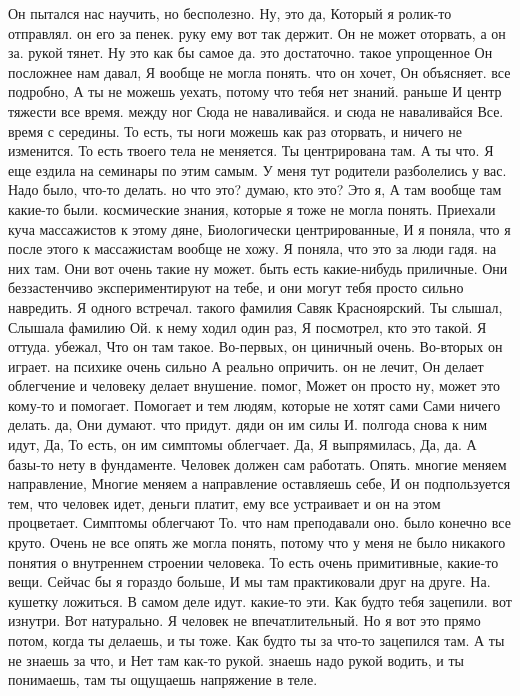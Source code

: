 Он пытался нас научить, но бесполезно. Ну, это да, Который я ролик-то отправлял. он его за пенек. руку ему вот так держит. Он не может оторвать, а он за.
рукой тянет. Ну это как бы самое да. это достаточно. такое упрощенное Он посложнее нам давал, Я вообще не могла понять.
что он хочет, Он объясняет.
все подробно, А ты не можешь уехать, потому что
тебя нет знаний.
раньше И центр тяжести все время.
между ног Сюда не наваливайся.
и сюда не наваливайся Все.
время с середины.
То есть, ты ноги можешь как раз оторвать, и ничего не изменится.
То есть твоего тела не меняется.
Ты центрирована там.
А ты что.
Я еще ездила на семинары по этим самым.
У меня тут родители разболелись у вас.
Надо было, что-то делать.
но что это?
думаю, кто это? Это я, А там вообще там какие-то были.
космические знания, которые я тоже не могла понять. Приехали куча массажистов к этому дяне, Биологически центрированные, И я поняла, что я после этого к массажистам вообще не хожу. Я поняла, что это за люди гадя.
на них там. Они вот очень такие ну может.
быть есть какие-нибудь приличные. Они беззастенчиво экспериментируют на тебе, и они могут тебя просто сильно навредить. Я одного встречал.
такого фамилия Савяк Красноярский. Ты слышал, Слышала фамилию Ой.
к нему ходил один раз, Я посмотрел, кто это такой. Я оттуда.
убежал, Что он там такое.
Во-первых, он циничный очень.
Во-вторых он играет.
на психике очень сильно А реально опричить. он не лечит, Он делает облегчение и
человеку делает внушение.
помог, Может он просто ну, может это кому-то и помогает. Помогает и тем людям, которые не хотят сами Сами ничего делать.
да, Они думают.
что придут. дяди он им силы И.
полгода снова к ним идут, Да, То есть, он им симптомы облегчает. Да, Я выпрямилась, Да, да.
А базы-то нету в фундаменте. Человек должен сам работать.
Опять. многие меняем направление, Многие меняем а направление оставляешь себе, И он подпользуется тем, что человек идет, деньги платит, ему все устраивает и он на этом процветает. Симптомы облегчают То.
что нам преподавали оно.
было конечно все круто.
Очень не все опять же могла понять, потому что у меня не было никакого понятия о внутреннем строении человека.
То есть очень примитивные, какие-то вещи.
Сейчас бы я гораздо больше, И мы там практиковали друг на друге.
На.
кушетку ложиться. В самом деле идут.
какие-то эти.
Как будто тебя зацепили. вот изнутри.
Вот натурально.
Я человек не впечатлительный.
Но я вот это прямо потом, когда ты делаешь, и ты тоже.
Как будто ты за что-то зацепился там.
А ты не знаешь за что, и Нет там как-то рукой. знаешь надо рукой водить, и ты понимаешь, там ты ощущаешь напряжение в теле.
